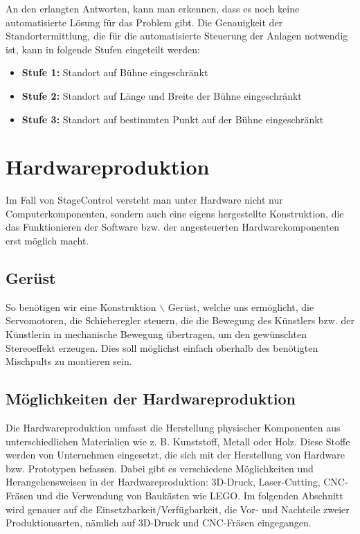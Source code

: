 An den erlangten Antworten, kann man erkennen, dass es noch keine automatisierte Lösung für das Problem gibt. Die Genauigkeit der Standortermittlung, die für die automatisierte Steuerung der Anlagen notwendig ist, kann in folgende Stufen eingeteilt werden: 

\begin{itemize}
	\item \textbf{Stufe 1: }Standort auf Bühne eingeschränkt
	\item \textbf{Stufe 2: }Standort auf Länge und Breite der Bühne eingeschränkt
	\item \textbf{Stufe 3: }Standort auf bestimmten Punkt auf der Bühne eingeschränkt
\end{itemize}

\section{Hardwareproduktion} \label{Hardwareproduktion}
Im Fall von StageControl versteht man unter Hardware nicht nur Computerkomponenten, sondern auch eine eigens hergestellte Konstruktion, die das Funktionieren der Software bzw. der angesteuerten Hardwarekomponenten erst möglich macht.

\subsection{Gerüst}
So benötigen wir eine Konstruktion $\backslash$ Gerüst, welche uns ermöglicht, die Servomotoren, die Schieberegler steuern, die die Bewegung des Künstlers bzw. der Künstlerin in mechanische Bewegung übertragen, um den gewünschten Stereoeffekt erzeugen. Dies soll möglichst einfach oberhalb des benötigten Mischpults zu montieren sein.


\subsection{Möglichkeiten der Hardwareproduktion}
Die Hardwareproduktion umfasst die Herstellung physischer Komponenten aus unterschiedlichen Materialien wie z. B. Kunststoff, Metall oder Holz. Diese Stoffe werden von Unternehmen eingesetzt, die sich mit der Herstellung von Hardware bzw. Prototypen befassen. Dabei gibt es verschiedene Möglichkeiten und Herangehensweisen in der Hardwareproduktion: 3D-Druck, Laser-Cutting, CNC-Fräsen und die Verwendung von Baukästen wie LEGO. Im folgenden Abschnitt wird genauer auf die Einsetzbarkeit/Verfügbarkeit, die Vor- und Nachteile zweier Produktionsarten, nämlich auf 3D-Druck und CNC-Fräsen eingegangen.

